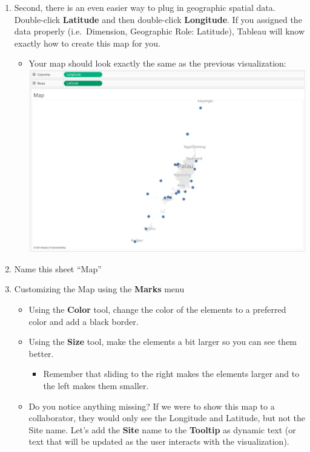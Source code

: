 \documentclass[
]{book}
\providecommand{\tightlist}{%
  \setlength{\itemsep}{0pt}\setlength{\parskip}{0pt}}
\begin{document}
\begin{enumerate}
\def\labelenumi{\arabic{enumi}.}
\setcounter{enumi}{3}
\tightlist
\item
  Second, there is an even easier way to plug in geographic spatial data. Double-click \textbf{Latitude} and then double-click \textbf{Longitude}. If you assigned the data properly (i.e.~Dimension, Geographic Role: Latitude), Tableau will know exactly how to create this map for you.

  \begin{itemize}
  \tightlist
  \item
    Your map should look exactly the same as the previous visualization:
    \includegraphics{images/M3S2_map-1.png}
  \end{itemize}
\item
  Name this sheet ``Map''
\item
  Customizing the Map using the \textbf{Marks} menu

  \begin{itemize}
  \tightlist
  \item
    Using the \textbf{Color} tool, change the color of the elements to a preferred color and add a black border.
  \item
    Using the \textbf{Size} tool, make the elements a bit larger so you can see them better.

    \begin{itemize}
    \tightlist
    \item
      Remember that sliding to the right makes the elements larger and to the left makes them smaller.
    \end{itemize}
  \item
    Do you notice anything missing? If we were to show this map to a collaborator, they would only see the Longitude and Latitude, but not the Site name. Let's add the \textbf{Site} name to the \textbf{Tooltip} as dynamic text (or text that will be updated as the user interacts with the visualization).


\end{itemize}
\end{enumerate}
\end{document}
